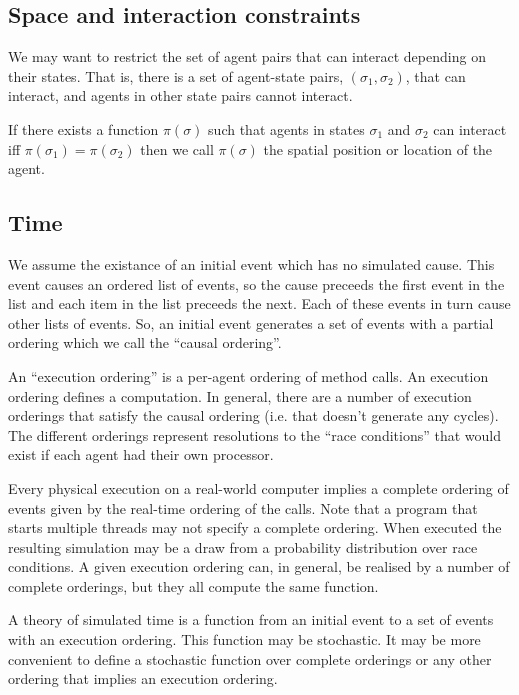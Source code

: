 \documentclass[a4paper]{article}
\begin{document}
\subsection{Space and interaction constraints}

We may want to restrict the set of agent pairs that can interact depending on their states. That is, there is a set of agent-state pairs, $(\sigma_1, \sigma_2)$, that can interact, and agents in other state pairs cannot interact.

If there exists a function $\pi(\sigma)$ such that agents in states $\sigma_1$ and $\sigma_2$ can interact iff $\pi(\sigma_1) = \pi(\sigma_2)$ then we call $\pi(\sigma)$ the spatial position or location of the agent.

\subsection{Time}

We assume the existance of an initial event which has no simulated cause. This event causes an ordered list of events, so the cause preceeds the first event in the list and each item in the list preceeds the next. Each of these events in turn cause other lists of events. So, an initial event generates a set of events with a partial ordering which we call the ``causal ordering''.

An ``execution ordering'' is a per-agent ordering of method calls. An execution ordering defines a computation. In general, there are a number of execution orderings that satisfy the causal ordering (i.e. that doesn't generate any cycles). The different orderings represent resolutions to the ``race conditions'' that would exist if each agent had their own processor.

Every physical execution on a real-world computer implies a complete ordering of events given by the real-time ordering of the calls. Note that a program that starts multiple threads may not specify a complete ordering. When executed the resulting simulation may be a draw from a probability distribution over race conditions. A given execution ordering can, in general, be realised by a number of complete orderings, but they all compute the same function.

A theory of simulated time is a function from an initial event to a set of events with an execution ordering. This function may be stochastic. It may be more convenient to define a stochastic function over complete orderings or any other ordering that implies an execution ordering.
\end{document}
